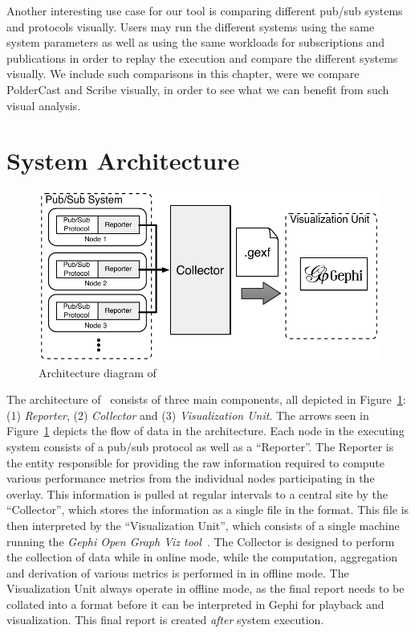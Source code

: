 Another interesting use case for our tool is comparing different pub/sub
systems and protocols visually. Users may run the different systems
using the same system parameters as well as using the same workloads for
subscriptions and publications in order to replay the
execution and compare the different systems visually. We include such
comparisons in this chapter, were we compare PolderCast and Scribe
visually, in order to see what we can benefit from such visual analysis.

\section{System Architecture}
\label{sec:arch}

\begin{figure}[h]
\centering
\includegraphics[width=\linewidth]{figures/arch}
\caption{Architecture diagram of \demo}
\label{fig:arch}
\end{figure}

The architecture of \demo~consists of three main components, all
depicted in Figure~\ref{fig:arch}: (1) \emph{Reporter}, (2)
\emph{Collector} and (3) \emph{Visualization Unit}.  The arrows seen in
Figure~\ref{fig:arch} depicts the flow of data in the architecture.
Each node in the executing system consists of a pub/sub protocol as well
as a ``Reporter''. The Reporter is the entity responsible for providing
the raw information required to compute various performance metrics from
the individual nodes participating in the overlay. This information is
pulled at regular intervals to a central site by the ``Collector'',
which stores the information as a single file in the \gexf{} format.
This file is then interpreted by the ``Visualization Unit'', which
consists of a single machine running the \emph{Gephi Open Graph Viz
tool}~\cite{ICWSM09154}. The Collector is designed to perform the collection of
data while in online mode, while the computation, aggregation and
derivation of various metrics is performed in in offline mode. The
Visualization Unit always operate in offline mode, as the
final report needs to be collated into a \gexf{} format before it can be
interpreted in Gephi for playback and visualization. This final report
is created \emph{after} system execution.

